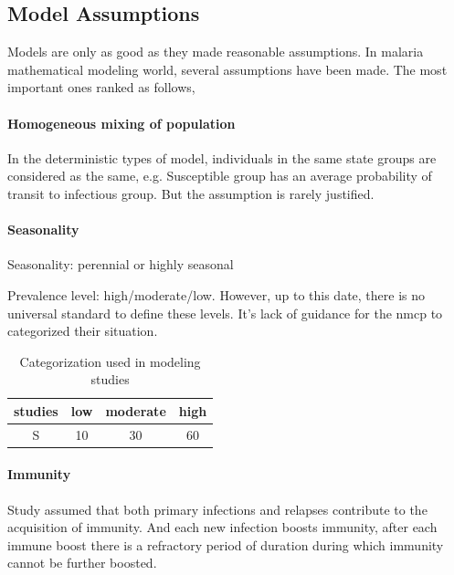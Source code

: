 \documentclass[a4paper, 12pt, twoside]{article}
\begin{document}
\subsection{Model Assumptions}
Models are only as good as they made reasonable assumptions. In malaria mathematical modeling world, several assumptions have been made. The most important ones ranked as follows,

\paragraph{Homogeneous mixing of population}%
\label{par:homogeneous_mixing_of_population}
In the deterministic types of model, individuals in the same state groups are considered as the same, e.g. Susceptible group has an average probability of transit to infectious group. But the assumption is rarely justified.

\paragraph{Seasonality}%
\label{par:seasonality}
Seasonality: perennial or highly seasonal

Prevalence level: high/moderate/low.
However, up to this date, there is no universal standard to define these levels.
It's lack of guidance for the \gls{nmcp} to categorized their situation.

\begin{table}
	\centering
	\begin{tabular}{c S S S}
		\toprule
		studies & {low} & {moderate} & {high} \\
		\midrule
		S       & 10    & 30         & 60     \\
		\bottomrule
	\end{tabular}
	\caption{Categorization used in modeling studies}
\end{table}

\paragraph{Immunity}%
\label{par:immunity}
Study\cite{White2018b} assumed that both primary infections and relapses contribute to the acquisition of immunity.
And each new infection boosts immunity, after each immune boost there is a refractory period of duration during which immunity cannot be further boosted. 
\end{document}
